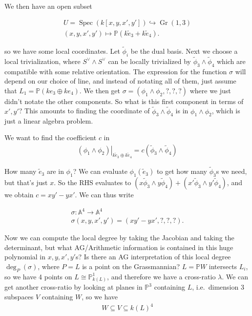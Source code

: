 \begin{example}[?]
We then have an open subset

\begin{align*} U =\operatorname{Spec}(k[x,y,x',y']) \hookrightarrow{\operatorname{Gr}}(1,3) \\ (x,y,x',y') \mapsto {\mathbb{P}}(k\tilde e_3 +k\tilde e_4) .\end{align*}

so we have some local coordinates. Let \(\tilde \phi_i\) be the dual
basis. Next we choose a local trivialization, where
\(S^\vee\wedge S^\vee\) can be locally trivialized by
\(\tilde\phi_3 \wedge \tilde \phi_4\) which are compatible with some
relative orientation. The expression for the function \(\sigma\) will
depend on our choice of line, and instead of notating all of them, just
assume that \(L_1 = {\mathbb{P}}(ke_3 \oplus ke_4)\). We then get
\(\sigma =(\phi_1 \wedge \phi_2, ?, ?, ?)\) where we just didn't notate
the other components. So what is this first component in terms of
\(x', y'\)? This amounts to finding the coordinate of
\(\tilde\phi_3 \wedge \tilde\phi_4\) is in \(\phi_1 \wedge \phi_2\),
which is just a linear algebra problem.

We want to find the coefficient \(c\) in
\begin{align*}
 {\left.{{(\phi_1 \wedge \phi_2)}} \right|_{{k\tilde e_3 \oplus k\tilde e_4}} }  = c (\tilde\phi_3 \wedge \tilde\phi_4)
\end{align*}

How many \(\tilde e_3\) are in \(\phi_1\)? We can evaluate
\(\phi_1(\tilde e_3)\) to get how many \(\tilde \phi_3\)s we need, but
that's just \(x\). So the RHS evaluates to
\((x \tilde\phi_3 \wedge y\tilde\phi_4) + (x'\tilde\phi_3 \wedge y'\tilde\phi_4)\),
and we obtain \(c = xy' -yx'\). We can thus write

\begin{align*} \sigma: {\mathbb{A}}^4 \to {\mathbb{A}}^4 \\ \sigma(x,y,x',y') = (xy' -yx', ?, ? , ?) .\end{align*}

Now we can compute the local degree by taking the Jacobian and taking
the determinant, but what AG/Arithmetic information is contained in this
huge polynomial in \(x,y,x',y'\)s? Is there an AG interpretation of this
local degree \(\deg_P(\sigma)\), where \(P=L\) is a point on the
Grassmannian? \(L={\mathbb{P}}W\) intersects \(L_i\), so we have 4
points on \(L\cong {\mathbb{P}}^1_{k(L)}\), and therefore we have a
cross-ratio \(\lambda\). We can get another cross-ratio by looking at
planes in \({\mathbb{P}}^3\) containing \(L\), i.e.~dimension 3
subspaces \(V\) containing \(W\), so we have
\begin{align*}
W \subseteq V \subseteq k(L)^4
\end{align*}


\end{example}
